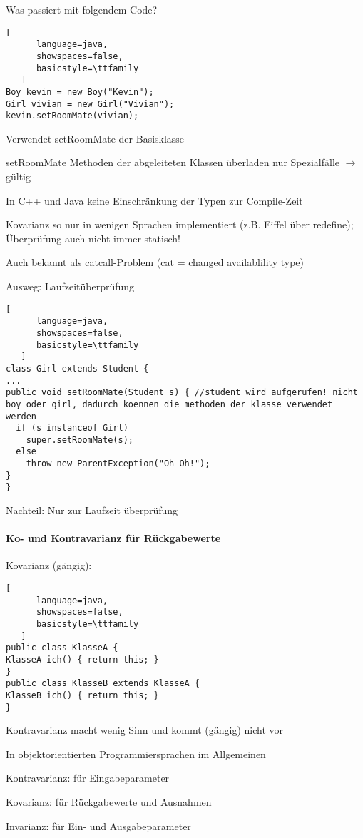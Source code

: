 \documentclass[10pt]{article}
\begin{document}
Was passiert mit folgendem Code?
\begin{lstlisting}[
      language=java,
      showspaces=false,
      basicstyle=\ttfamily
   ]
Boy kevin = new Boy("Kevin");
Girl vivian = new Girl("Vivian");
kevin.setRoomMate(vivian);
\end{lstlisting}

\begin{itemize*}
  \item Verwendet setRoomMate der Basisklasse
  \item setRoomMate Methoden der abgeleiteten Klassen überladen nur Spezialfälle $\rightarrow$ gültig
  
  \item In C++ und Java keine Einschränkung der Typen zur Compile-Zeit
  \item Kovarianz so nur in wenigen Sprachen implementiert (z.B. Eiffel über redefine); Überprüfung auch nicht immer statisch!
  \item Auch bekannt als catcall-Problem (cat = changed availablility type)
\end{itemize*}
Ausweg: Laufzeitüberprüfung
\begin{lstlisting}[
      language=java,
      showspaces=false,
      basicstyle=\ttfamily
   ]
class Girl extends Student {
...
public void setRoomMate(Student s) { //student wird aufgerufen! nicht boy oder girl, dadurch koennen die methoden der klasse verwendet werden
  if (s instanceof Girl)
    super.setRoomMate(s);
  else
    throw new ParentException("Oh Oh!");
}
}
\end{lstlisting}

Nachteil: Nur zur Laufzeit überprüfung

\paragraph{Ko- und Kontravarianz für Rückgabewerte}
Kovarianz (gängig):
\begin{lstlisting}[
      language=java,
      showspaces=false,
      basicstyle=\ttfamily
   ]
public class KlasseA {
KlasseA ich() { return this; }
}
public class KlasseB extends KlasseA {
KlasseB ich() { return this; }
}
\end{lstlisting}

Kontravarianz macht wenig Sinn und kommt (gängig) nicht vor

In objektorientierten Programmiersprachen im Allgemeinen
\begin{itemize*}
  \item Kontravarianz: für Eingabeparameter
  \item Kovarianz: für Rückgabewerte und Ausnahmen
  \item Invarianz: für Ein- und Ausgabeparameter
\end{itemize*}
\end{document}
